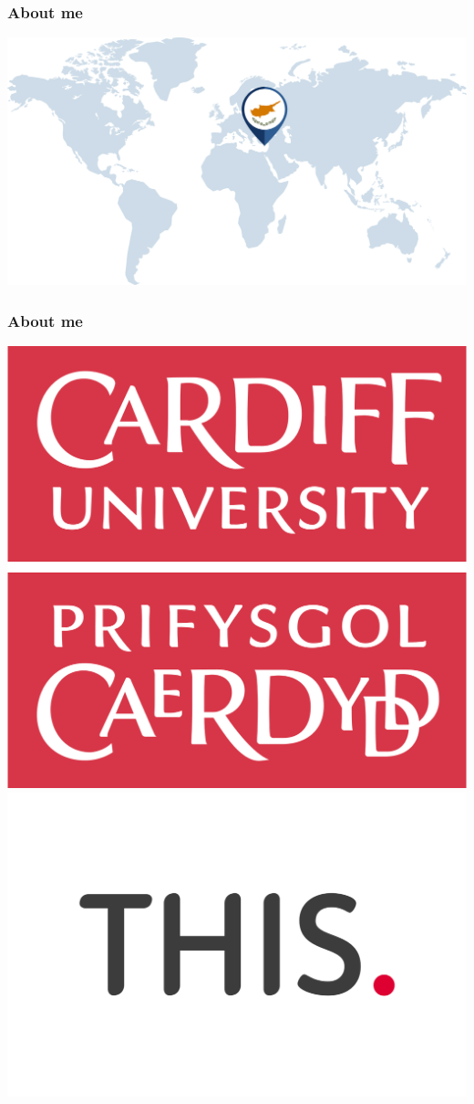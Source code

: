 \begin{frame}
    \frametitle{About me}
    \centering

    \includegraphics[scale=0.5]{Bin/Cyprus-map.png}

\end{frame}


\begin{frame}
    \frametitle{About me}
    \centering
        
    \includegraphics[scale=0.1]{Bin/CardiffUniLogo.png}
    \includegraphics[scale=0.15]{Bin/THISLogo.png}

\end{frame}